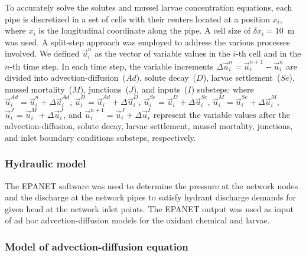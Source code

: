 \documentclass[review,authoryear]{elsarticle}
\begin{document}
To accurately solve the solutes and mussel larvae concentration equations,
each pipe is discretized in a set of cells with their centers located at a
position $x_i$, where $x_i$ is the longitudinal coordinate along the pipe. A
cell size of $\delta x_i=10$~m was used. A split-step approach was employed to
address the various processes involved. We defined $\vec{u}_i^n$ as the vector
of variable values in the $i$-th cell and in the $n$-th time step. In each time
step, the variable increments $\Delta\vec{u}_i^n=\vec{u}_i^{n+1}-\vec{u}_i^n$
are divided into advection-diffusion~($Ad$), solute decay~($D$),
larvae settlement~($Se$), mussel mortality~($M$), junctions~($J$), and
inputs~($I$) substeps:
where $\vec{u}_i^{Ad}=\vec{u}_i^n+\Delta\vec{u}_i^{Ad}$,
$\vec{u}_i^D=\vec{u}_i^{Ad}+\Delta\vec{u}_i^D$,
$\vec{u}_i^{Se}=\vec{u}_i^D+\Delta\vec{u}_i^{Se}$,
$\vec{u}_i^M=\vec{u}_i^{Se}+\Delta\vec{u}_i^M$,
$\vec{u}_i^J=\vec{u}_i^M+\Delta\vec{u}_i^J$, and
$\vec{u}_i^{n+1}=\vec{u}_i^J+\Delta\vec{u}_i^I$ represent the variable values
after the advection-diffusion, solute decay, larvae settlement, mussel
mortality, junctions, and inlet boundary conditions substeps, respectively.

\subsubsection{Hydraulic model}

The EPANET software \citep{EPANET}
was used to determine the pressure at the
network nodes and the discharge at the network pipes to satisfy hydrant
discharge demands for given head at the network inlet points. The EPANET output
was used as input of ad hoc advection-diffusion models for the oxidant chemical
and larvae.

\subsubsection{Model of advection-diffusion equation}
\end{document}
